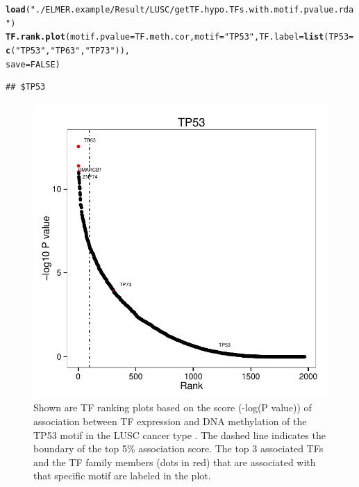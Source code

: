 \documentclass{article}\usepackage[]{graphicx}\usepackage[]{color}
\makeatletter
\def\maxwidth{ %
  \ifdim\Gin@nat@width>\linewidth
    \linewidth
  \else
    \Gin@nat@width
  \fi
}
\newcommand{\hlnum}[1]{\textcolor[rgb]{0.686,0.059,0.569}{#1}}%
\newcommand{\hlstr}[1]{\textcolor[rgb]{0.192,0.494,0.8}{#1}}%
\newcommand{\hlstd}[1]{\textcolor[rgb]{0.345,0.345,0.345}{#1}}%
\newcommand{\hlkwc}[1]{\textcolor[rgb]{0.333,0.667,0.333}{#1}}%
\newcommand{\hlkwd}[1]{\textcolor[rgb]{0.737,0.353,0.396}{\textbf{#1}}}%
\newenvironment{kframe}{%
 \def\at@end@of@kframe{}%
 \ifinner\ifhmode%
  \def\at@end@of@kframe{\end{minipage}}%
  \begin{minipage}{\columnwidth}%
 \fi\fi%
 \def\FrameCommand##1{\hskip\@totalleftmargin \hskip-\fboxsep
 \colorbox{shadecolor}{##1}\hskip-\fboxsep
     \hskip-\linewidth \hskip-\@totalleftmargin \hskip\columnwidth}%
 \MakeFramed {\advance\hsize-\width
   \@totalleftmargin\z@ \linewidth\hsize
   \@setminipage}}%
 {\par\unskip\endMakeFramed%
 \at@end@of@kframe}
\newenvironment{knitrout}{}{} %
\makeatother
\begin{document}
\begin{knitrout}
\color{fgcolor}\begin{kframe}
\begin{alltt}
\hlkwd{load}\hlstd{(}\hlstr{"./ELMER.example/Result/LUSC/getTF.hypo.TFs.with.motif.pvalue.rda"}\hlstd{)}
\hlkwd{TF.rank.plot}\hlstd{(}\hlkwc{motif.pvalue}\hlstd{=TF.meth.cor,} \hlkwc{motif}\hlstd{=}\hlstr{"TP53"}\hlstd{,} \hlkwc{TF.label}\hlstd{=}\hlkwd{list}\hlstd{(}\hlkwc{TP53}\hlstd{=}\hlkwd{c}\hlstd{(}\hlstr{"TP53"}\hlstd{,}\hlstr{"TP63"}\hlstd{,}\hlstr{"TP73"}\hlstd{)),}
             \hlkwc{save}\hlstd{=}\hlnum{FALSE}\hlstd{)}
\end{alltt}
\begin{verbatim}
## $TP53
\end{verbatim}
\end{kframe}\begin{figure}
\includegraphics[width=\maxwidth]{figure/figure7-1} \caption[TF Ranking]{\label{fig:TP53.TFrankPlot} Shown are TF ranking plots based on the score (-log(P value)) of association between TF expression and DNA methylation of the TP53 motif in the LUSC cancer type . The dashed line indicates the boundary of the top 5\% association score. The top 3 associated TFs and the TF family members (dots in red) that are associated with that specific motif are labeled in the plot.}\label{fig:figure7}
\end{figure}



\end{knitrout}
\end{document}
